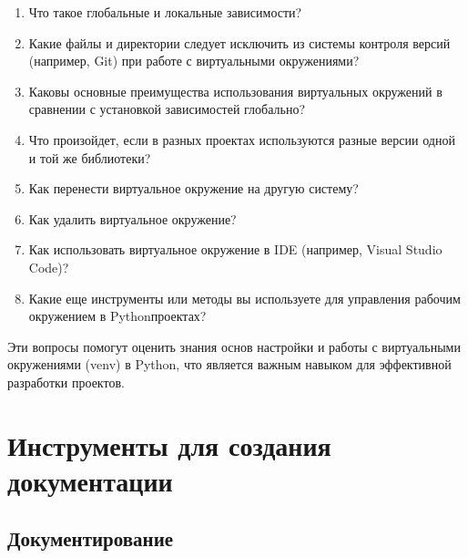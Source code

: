 \documentclass[letterpaper,10pt,russian]{sphinxmanual}
\begin{document}
\begin{enumerate}
\item {} 
\sphinxAtStartPar
Что такое глобальные и локальные зависимости?

\item {} 
\sphinxAtStartPar
Какие файлы и директории следует исключить из системы контроля версий (например, Git) при работе с виртуальными окружениями?

\item {} 
\sphinxAtStartPar
Каковы основные преимущества использования виртуальных окружений в сравнении с установкой зависимостей глобально?

\item {} 
\sphinxAtStartPar
Что произойдет, если в разных проектах используются разные версии одной и той же библиотеки?

\item {} 
\sphinxAtStartPar
Как перенести виртуальное окружение на другую систему?

\item {} 
\sphinxAtStartPar
Как удалить виртуальное окружение?

\item {} 
\sphinxAtStartPar
Как использовать виртуальное окружение в IDE (например, Visual Studio Code)?

\item {} 
\sphinxAtStartPar
Какие еще инструменты или методы вы используете для управления рабочим окружением в Python\sphinxhyphen{}проектах?

\end{enumerate}

\sphinxAtStartPar
Эти вопросы помогут оценить знания основ настройки и работы с виртуальными окружениями (venv) в Python, что является важным навыком для эффективной разработки проектов.


\chapter{Инструменты для создания документации}
\label{\detokenize{index:id13}}
\sphinxstepscope


\section{Документирование}
\label{\detokenize{educational_materials/docs/content:id1}}\label{\detokenize{educational_materials/docs/content::doc}}
\end{document}
